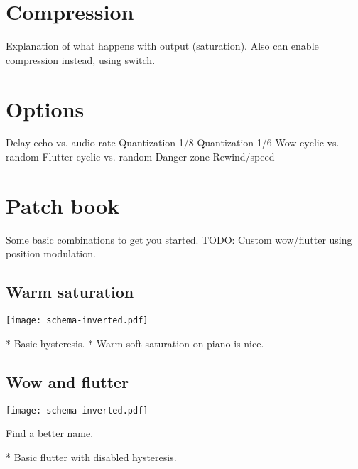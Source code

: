 \documentclass[11pt]{article}
\begin{document}
\section{Compression}

Explanation of what happens with output (saturation). Also can enable compression instead, using switch.

\section{Options}

Delay echo vs. audio rate
Quantization 1/8
Quantization 1/6
Wow cyclic vs. random
Flutter cyclic vs. random
Danger zone
Rewind/speed

\newpage

\section{Patch book}

Some basic combinations to get you started. TODO: Custom wow/flutter using position modulation.

\vspace{5mm}
\noindent
\begin{minipage}[t]{0.45\textwidth}

\subsection{Warm saturation}

\vspace{5mm}
\begin{center}
  \texttt{[image: schema-inverted.pdf]}
\end{center}

* Basic hysteresis.
* Warm soft saturation on piano is nice.

\end{minipage}%
\begin{minipage}{0.05\textwidth}
\phantom{ }
\end{minipage}%
\begin{minipage}[t]{0.45\textwidth}
\subsection{Wow and flutter}

\vspace{5mm}
\begin{center}
  \texttt{[image: schema-inverted.pdf]}
\end{center}

Find a better name.

* Basic flutter with disabled hysteresis.
\end{minipage}
\end{document}
